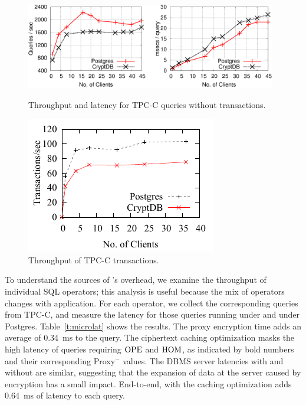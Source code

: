\begin{figure}[t!]
\begin{minipage}[t]{4.3in}
\centering
\includegraphics[width=4.3in]{fig/queries.pdf}
\caption{Throughput and latency for TPC-C queries without transactions.}
\label{fig:querytputlat}
\end{minipage}
\hspace{0.3cm}
\begin{minipage}[t]{2.1in}
\centering
\includegraphics{fig/trantput.pdf}
\caption{Throughput of TPC-C transactions.}
\label{fig:trantput}
\end{minipage}
\end{figure}


To understand the sources of \name's overhead, we examine the
throughput of individual SQL operators; this analysis is useful
because the mix of operators changes with application.  For each
operator, we collect the corresponding queries from TPC-C, and
measure the latency for those queries running under \name and under
Postgres.  Table~\ref{t:microlat} shows the results.
The proxy encryption time adds an average of 0.34~ms to the query.
The ciphertext caching optimization masks the high latency of queries
requiring $\textrm{OPE}$ and $\textrm{HOM}$, as indicated by bold numbers and their
corresponding Proxy$^-$ values.
The DBMS server latencies with and without \name are similar,
suggesting that the expansion of data at the server caused by encryption has a small
impact.
End-to-end, \name with the caching optimization adds
0.64~ms of latency to each query.

